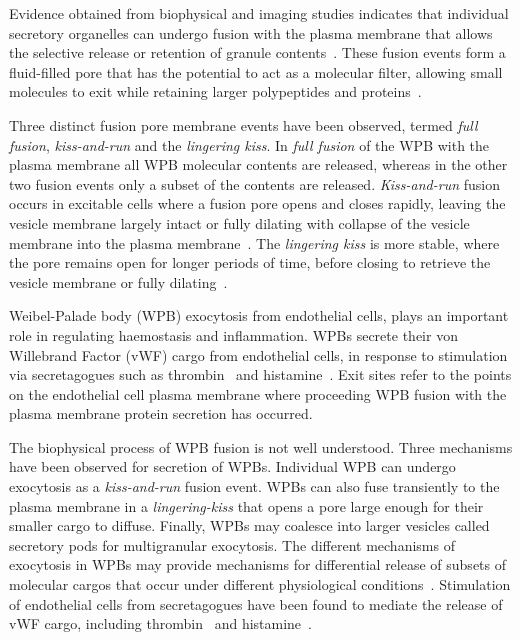 Evidence obtained from biophysical and imaging studies indicates that individual secretory organelles can undergo fusion with the plasma membrane that allows the selective release or retention of granule contents~\cite{Babich2008}. These fusion events form a fluid-filled pore that has the potential to act as a molecular filter, allowing small molecules to exit while retaining larger polypeptides and proteins~\cite{MacDonald2006}.

Three distinct fusion pore membrane events have been observed, termed \emph{full fusion}, \emph{kiss-and-run} and the \emph{lingering kiss}. In \emph{full fusion} of the WPB with the plasma membrane all WPB molecular contents are released, whereas in the other two fusion events only a subset of the contents are released. \emph{Kiss-and-run} fusion occurs in excitable cells where a fusion pore opens and closes rapidly, leaving the vesicle membrane largely intact or fully dilating with collapse of the vesicle membrane into the plasma membrane~\cite{Lindau2003}. The \emph{lingering kiss} is more stable, where the pore remains open for longer periods of time, before closing to retrieve the vesicle membrane or fully dilating~\cite{Fernandez-Chacon1995}.

Weibel-Palade body (WPB) exocytosis from endothelial cells, plays an important role in regulating haemostasis and inflammation. WPBs secrete their von Willebrand Factor (vWF) cargo from endothelial cells, in response to stimulation via secretagogues such as thrombin~\cite{Levine1982} and histamine~\cite{Hamilton1987}. Exit sites refer to the points on the endothelial cell plasma membrane where proceeding WPB fusion with the plasma membrane protein secretion has occurred.

The biophysical process of WPB fusion is not well understood. Three mechanisms have been observed for secretion of WPBs. Individual WPB can undergo exocytosis as a \emph{kiss-and-run} fusion event. WPBs can also fuse transiently to the plasma membrane in a \emph{lingering-kiss} that opens a pore large enough for their smaller cargo to diffuse. Finally, WPBs may coalesce into larger vesicles called secretory pods for multigranular exocytosis. The different mechanisms of exocytosis in WPBs may provide mechanisms for differential release of subsets of molecular cargos that occur under different physiological conditions~\cite{Valentijn2014}. Stimulation of endothelial cells from secretagogues have been found to mediate the release of vWF cargo, including thrombin~\cite{Levine1982} and histamine~\cite{Hamilton1987}.

